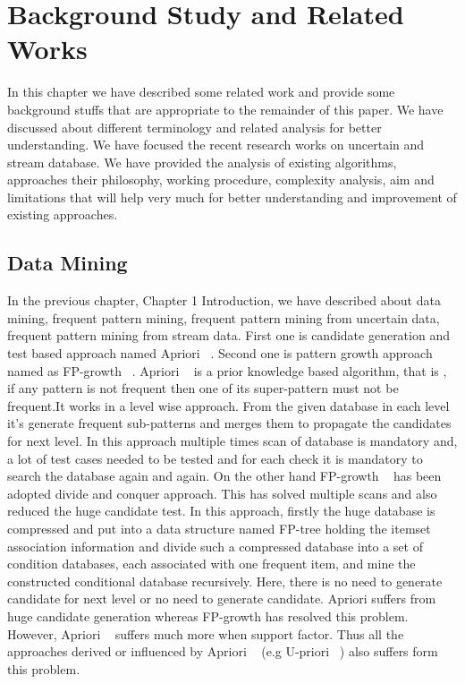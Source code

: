 %
\chapter{Background Study and Related Works}

In this chapter we have described some related work and provide some background stuffs that are  appropriate to the remainder of this paper. We have discussed about different terminology and related analysis for better understanding. We have focused the recent research works on uncertain and stream database. We have provided the analysis of existing algorithms, approaches their philosophy, working procedure, complexity analysis, aim and limitations that will help very much for better understanding and improvement of existing approaches.

\section{Data Mining}
In the previous chapter, Chapter 1 Introduction, we have described about data mining, frequent pattern mining, frequent pattern mining from uncertain data, frequent pattern mining from stream data. First one is candidate generation and test based approach named Apriori ~\cite{apriori}. Second one is pattern growth approach named as FP-growth ~\cite{fp_growth}. Apriori ~\cite{apriori} is a prior knowledge based  algorithm, that is , if any pattern is not frequent then one of its super-pattern must not be frequent.It works in a level wise approach. From the given database in each level it's generate frequent sub-patterns and merges them to propagate the candidates for next level. In this approach multiple times scan of database is mandatory and, a lot of test cases needed to be tested and for each check it is mandatory to search the database again and again. On the other hand FP-growth ~\cite{fp_growth} has been adopted divide and conquer approach. This has solved multiple scans and also reduced the huge candidate test. In this approach, firstly the huge database is compressed and put into a data structure named FP-tree holding the  itemset association information and divide such a compressed database into a set of condition databases, each associated with one frequent item, and mine the constructed conditional database recursively. Here, there is no need to generate candidate for next level or no need to generate candidate. Apriori suffers from huge candidate generation whereas FP-growth has resolved this problem. However, Apriori ~\cite{apriori} suffers much more when support factor. Thus all the approaches derived or influenced by Apriori ~\cite{apriori} (e.g U-priori ~\cite{u_priori}) also suffers form this problem.


